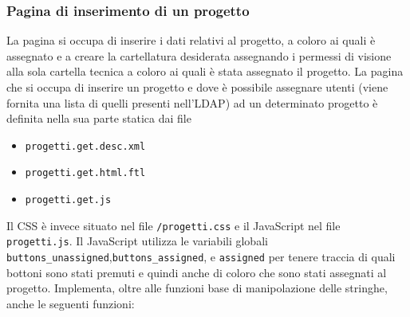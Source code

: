 \subsubsection{Pagina di inserimento di un progetto}
La pagina si occupa di inserire i dati relativi al progetto, a coloro ai quali è assegnato e a creare la cartellatura desiderata assegnando i permessi di visione alla sola cartella tecnica a coloro ai quali è stata assegnato il progetto.
La pagina che si occupa di inserire un progetto e dove è possibile assegnare utenti (viene fornita una lista di quelli presenti nell’LDAP) ad un determinato progetto è definita nella sua parte statica dai file
\begin{itemize}
\item \texttt{progetti.get.desc.xml}
\item \texttt{progetti.get.html.ftl}
\item \texttt{progetti.get.js}
\end{itemize}
Il CSS è invece situato nel file \texttt{/progetti.css} e il JavaScript nel file \texttt{progetti.js}.
Il JavaScript utilizza le variabili globali  \texttt{buttons\_unassigned},\texttt{buttons\_assigned}, e  \texttt{assigned}
 per tenere traccia  di quali bottoni sono stati premuti e quindi anche di coloro che sono stati assegnati al progetto. Implementa,  oltre alle funzioni base di manipolazione delle stringhe, anche le seguenti funzioni:
